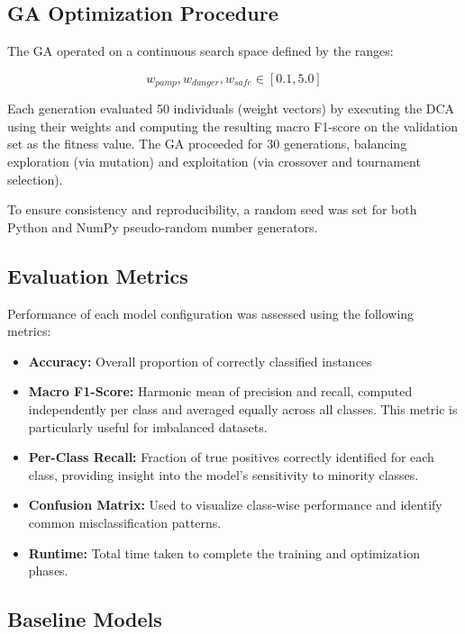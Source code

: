 \documentclass[conference]{IEEEtran}
\begin{document}
\subsection{GA Optimization Procedure}

The GA operated on a continuous search space defined by the ranges:

\[
  w_{pamp}, w_{danger}, w_{safe} \in [0.1, 5.0]
\]

Each generation evaluated 50 individuals (weight vectors) by
executing the DCA using their weights and computing the resulting
macro F1-score on the validation set as the fitness value. The GA
proceeded for 30 generations, balancing exploration (via mutation)
and exploitation (via crossover and tournament selection).

To ensure consistency and reproducibility, a random seed was set for
both Python and NumPy pseudo-random number generators.

\subsection{Evaluation Metrics}

Performance of each model configuration was assessed using the
following metrics:

\begin{itemize}
  \item \textbf{Accuracy:} Overall proportion of correctly
    classified instances
  \item \textbf{Macro F1-Score:} Harmonic mean of precision and
    recall, computed independently per class and averaged equally
    across all classes. This metric is particularly useful for
    imbalanced datasets.
  \item \textbf{Per-Class Recall:} Fraction of true positives
    correctly identified for each class, providing insight into the
    model's sensitivity to minority classes.
  \item \textbf{Confusion Matrix:} Used to visualize class-wise
    performance and identify common misclassification patterns.
  \item \textbf{Runtime:} Total time taken to complete the training
    and optimization phases.
\end{itemize}

\subsection{Baseline Models}
\end{document}
